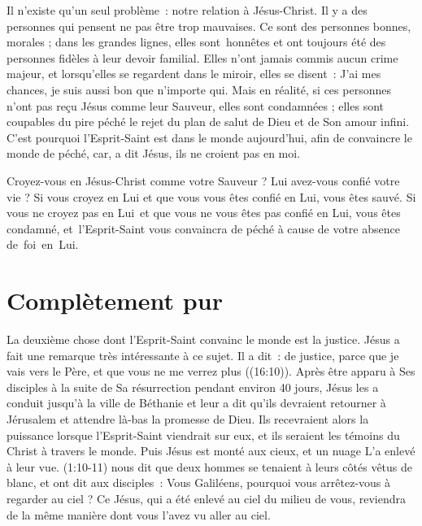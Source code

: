 Il n'existe qu'un seul problème~: notre relation à Jésus-Christ.
 Il y a des personnes qui pensent ne pas être trop mauvaises.
 Ce sont des personnes bonnes, morales ; dans les grandes lignes,
 elles sont~honnêtes et ont toujours été des personnes fidèles
 à leur devoir familial. Elles n'ont jamais commis aucun crime majeur,
 et lorsqu'elles se regardent dans le miroir, elles se disent~:
 \Og  J'ai mes chances, je suis aussi bon que n'importe qui. \Fg{}
 Mais en réalité, si ces personnes n'ont pas reçu Jésus comme leur Sauveur,
 elles sont condamnées ; elles sont coupables du pire péché
 \ocadr le rejet du plan de salut de Dieu et de Son amour infini.
 C'est pourquoi l'Esprit-Saint est dans le monde aujourd'hui,
 afin de convaincre le monde de péché,
 \Og car, a dit Jésus, ils ne croient pas en moi. \Fg{}

Croyez-vous en Jésus-Christ comme votre Sauveur ?
 Lui avez-vous confié votre vie ? Si vous croyez en Lui et que vous vous êtes
 confié en Lui, vous êtes sauvé.
 Si vous ne croyez pas en Lui~et que vous ne vous êtes pas confié en Lui,
 vous êtes condamné, et~l'Esprit-Saint vous convaincra de péché
 à cause de votre absence de~foi~en~Lui. %

\pagebreak


\section{Compl\`etement pur}

La deuxième chose dont l'Esprit-Saint convainc le monde est la justice.
 Jésus a fait une remarque très intéressante à ce sujet. Il a dit~:
 \Og [\dots{}] de justice, parce que je vais vers le Père,
 et que vous ne me verrez plus \Fg{} ((16:10)).
 Après être apparu à Ses disciples à la suite de Sa résurrection
 pendant environ 40 jours, Jésus les a conduit jusqu'à la ville
 de Béthanie et leur a dit qu'ils devraient retourner à Jérusalem
 et attendre là-bas la promesse de Dieu.
 Ils recevraient alors la puissance lorsque l'Esprit-Saint viendrait sur eux,
 et ils seraient les témoins du Christ à travers le monde.
 Puis Jésus est monté aux cieux, et un nuage L'a enlevé à leur vue.
 (1:10-11) nous dit que deux hommes se tenaient à leurs côtés
 vêtus de blanc, et ont dit aux disciples~:
 \Og Vous Galiléens, pourquoi vous arrêtez-vous à regarder au ciel ?
 Ce Jésus, qui a été enlevé au ciel du milieu de vous,
 reviendra de la même manière dont vous l'avez vu aller au ciel. \Fg{}

